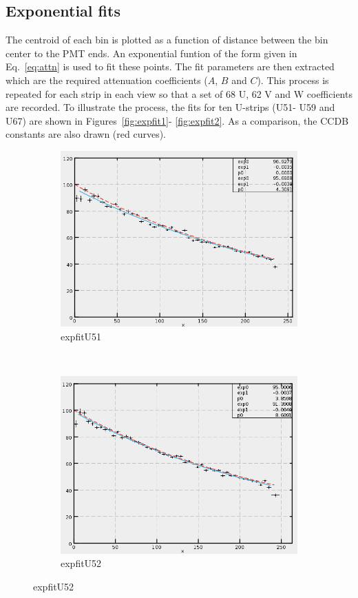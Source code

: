 \subsection{Exponential fits}
The centroid of each bin is plotted as a function of distance between the bin center to the PMT ends. An exponential funtion of the
form given in Eq.~\ref{eq:attn} is used to fit these points. The fit parameters are then extracted which are the required attenuation
 coefficients ($A$, $B$ and $C$). This process is repeated for each strip in each view so that a set of 68 U, 62 V and W coefficients 
 are recorded. To illustrate the process, the fits for ten U-strips (U51- U59 and U67) are shown in Figures~\ref{fig:expfit1}-
\ref{fig:expfit2}. As a comparison, the CCDB constants are also drawn (red curves).
\begin{figure}[h]
    \centering
    \begin{subfigure}[h]{0.44\textwidth}
        \centering
        \includegraphics[width=\textwidth, keepaspectratio = true]{expfit_U51}
        \caption{expfitU51}
        \label{fig:expfit_U51}
    \end{subfigure}
    ~
    \begin{subfigure}[h]{0.44\textwidth}
        \centering
        \includegraphics[width=\textwidth, keepaspectratio = true]{expfit_U52}
        \caption{expfitU52}
        \label{fig:expfit_U52}
    \end{subfigure}
    

\end{figure}
